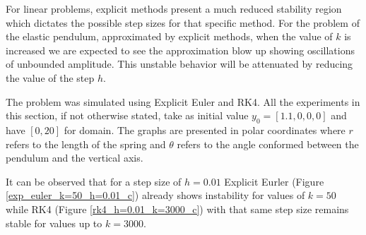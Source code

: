 \documentclass{scrartcl}
\begin{document}
For linear problems, explicit methods present a much reduced stability region which dictates the possible step sizes for that specific method.
For the problem of the elastic pendulum, approximated by explicit methods, when the value of $k$ is increased we are expected to see the approximation blow up showing oscillations of unbounded amplitude.
This unstable behavior will be attenuated by reducing the value of the step $h$.

The problem was simulated using Explicit Euler and RK4.
All the experiments in this section, if not otherwise stated, take as initial value $y_0 = [1.1, 0, 0, 0]$ and have $[0, 20]$ for domain.
The graphs are presented in polar coordinates where $r$ refers to the length of the spring and $\theta$ refers to the angle conformed between the pendulum and the vertical axis.

It can be observed that for a step size of $h=0.01$ Explicit Eurler (Figure \ref{exp_euler_k=50_h=0.01_c}) already shows instability for values of $k=50$ while RK4 (Figure \ref{rk4_h=0.01_k=3000_c}) with that same step size remains stable for values up to $k=3000$.
\end{document}
